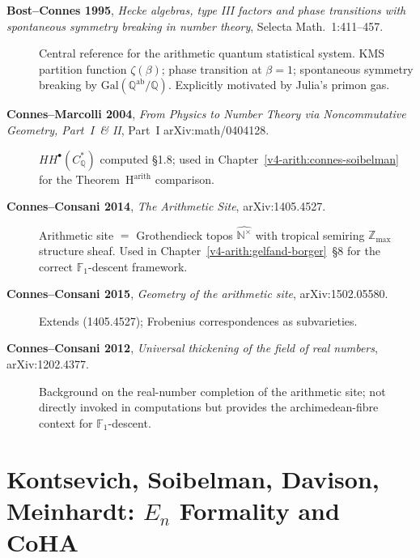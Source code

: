 \begin{description}
\item[\textbf{Bost--Connes 1995}, \emph{Hecke algebras, type III
factors and phase transitions with spontaneous symmetry breaking in
number theory}, Selecta Math.~1:411--457.] Central reference for
the arithmetic quantum statistical system. KMS partition function
\(\zeta(\beta)\); phase transition at \(\beta=1\); spontaneous
symmetry breaking by \(\mathrm{Gal}(\mathbb{Q}^{\mathrm{ab}}/\mathbb{Q})\).
Explicitly motivated by Julia's primon gas.
\item[\textbf{Connes--Marcolli 2004}, \emph{From Physics to Number
Theory via Noncommutative Geometry, Part~I~\& II},
Part~I arXiv:math/0404128.] \(HH^{\bullet}(C^{*}_{\mathbb{Q}})\)
computed \S1.8; used in Chapter~\ref{v4-arith:connes-soibelman}
for the Theorem~H\(^{\mathrm{arith}}\) comparison.
\item[\textbf{Connes--Consani 2014}, \emph{The Arithmetic Site},
arXiv:1405.4527.] Arithmetic site \(=\) Grothendieck topos
\(\widehat{\mathbb{N}^{\times}}\) with tropical semiring
\(\mathbb{Z}_{\max}\) structure sheaf. Used in
Chapter~\ref{v4-arith:gelfand-borger}~\S8 for the correct
\(\mathbb{F}_{1}\)-descent framework.
\item[\textbf{Connes--Consani 2015}, \emph{Geometry of the
arithmetic site}, arXiv:1502.05580.] Extends (1405.4527); Frobenius
correspondences as subvarieties.
\item[\textbf{Connes--Consani 2012}, \emph{Universal thickening of
the field of real numbers}, arXiv:1202.4377.] Background on the
real-number completion of the arithmetic site; not directly invoked
in computations but provides the archimedean-fibre context for
\(\mathbb{F}_{1}\)-descent.
\end{description}

\section{Kontsevich, Soibelman, Davison, Meinhardt: \(E_{n}\) Formality and CoHA}
\label{v4-arith:app:A:kontsevich-etc}

